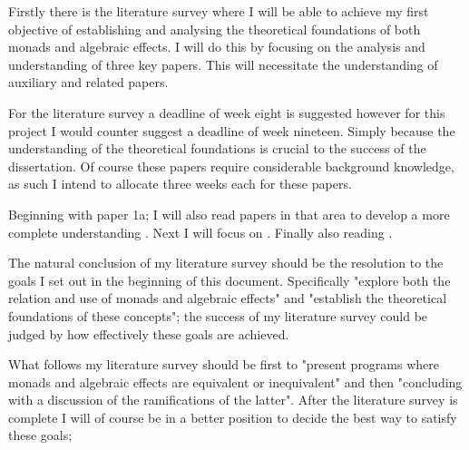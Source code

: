 \documentclass[a4paper,10pt]{article}
\begin{document}
Firstly there is the literature survey where I will be able to achieve my first objective
of establishing and analysing the theoretical foundations of both monads and algebraic
effects.
I will do this by focusing on the analysis and understanding of three key papers.
This will necessitate the understanding of auxiliary and related papers.

\par
For the literature survey a deadline of week eight is suggested however for this project I would
counter suggest a deadline of week nineteen. Simply because the understanding of the theoretical
foundations is crucial to the success of the dissertation.
Of course these papers require considerable background knowledge, as such
I intend to allocate three weeks each for these papers.

\par
Beginning with paper 1a;
I will also read papers in that area to develop a more complete understanding
\cite{wadler2003marriage, wadler1994monads, PeytonJones:1993}.
Next I will focus on \cite{Moggi:hc}.
Finally \cite{Plotkin:2001jr} also reading \cite{plotkin2001adequacy, Plotkin:2002dw}.

\par
The natural conclusion of my literature survey should be the resolution to the goals I set out
in the beginning of this document. Specifically
  "explore both the relation and use of monads and algebraic effects"
and
  "establish the theoretical foundations of these concepts";
the success of my literature survey could be judged by how effectively these goals are 
achieved.

\par
What follows my literature survey should be first to
  "present programs where monads and algebraic effects are equivalent or inequivalent"
and then
  "concluding with a discussion of the ramifications of the latter".
After the literature survey is complete I will of course be in a better position to decide
the best way to satisfy these goals;


\medskip



\end{document}
